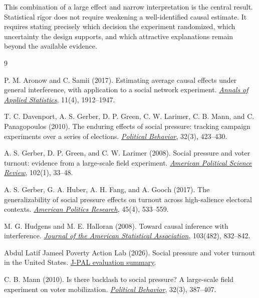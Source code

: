 \documentclass[a4paper,12pt]{article}
\begin{document}
This combination of a large effect and narrow interpretation is the central result. Statistical rigor does not require weakening a well-identified causal estimate. It requires stating precisely which decision the experiment randomized, which uncertainty the design supports, and which attractive explanations remain beyond the available evidence.

\footnotesize
\setlength{\parskip}{0.1em}
\begin{thebibliography}{9}
\setlength{\itemsep}{0pt}
\setlength{\parsep}{0pt}

P. M. Aronow and C. Samii (2017).
\newblock Estimating average causal effects under general interference, with application to a social network experiment.
\newblock \href{https://doi.org/10.1214/16-AOAS1005}{\emph{Annals of Applied Statistics}}, 11(4), 1912--1947.

T. C. Davenport, A. S. Gerber, D. P. Green, C. W. Larimer, C. B. Mann, and C. Panagopoulos (2010).
\newblock The enduring effects of social pressure: tracking campaign experiments over a series of elections.
\newblock \href{https://doi.org/10.1007/s11109-010-9122-0}{\emph{Political Behavior}}, 32(3), 423--430.

A. S. Gerber, D. P. Green, and C. W. Larimer (2008).
\newblock Social pressure and voter turnout: evidence from a large-scale field experiment.
\newblock \href{https://doi.org/10.1017/S000305540808009X}{\emph{American Political Science Review}}, 102(1), 33--48.

A. S. Gerber, G. A. Huber, A. H. Fang, and A. Gooch (2017).
\newblock The generalizability of social pressure effects on turnout across high-salience electoral contexts.
\newblock \href{https://doi.org/10.1177/1532673X16686556}{\emph{American Politics Research}}, 45(4), 533--559.

M. G. Hudgens and M. E. Halloran (2008).
\newblock Toward causal inference with interference.
\newblock \href{https://doi.org/10.1198/016214508000000292}{\emph{Journal of the American Statistical Association}}, 103(482), 832--842.

Abdul Latif Jameel Poverty Action Lab (2026).
\newblock Social pressure and voter turnout in the United States.
\newblock \href{https://www.povertyactionlab.org/evaluation/social-pressure-and-voter-turnout-united-states}{J-PAL evaluation summary}.

C. B. Mann (2010).
\newblock Is there backlash to social pressure? A large-scale field experiment on voter mobilization.
\newblock \href{https://doi.org/10.1007/s11109-010-9124-y}{\emph{Political Behavior}}, 32(3), 387--407.


\end{thebibliography}
\end{document}
